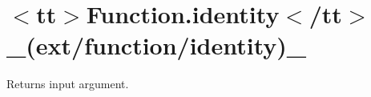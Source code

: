 \chapter{\texorpdfstring{$<$}{<}tt\texorpdfstring{$>$}{>}Function.\+identity\texorpdfstring{$<$}{<}/tt\texorpdfstring{$>$}{>} \+\_\+(ext/function/identity)\+\_\+}
\hypertarget{md__2home_2solype_2delivery_2current__days_2Mannheim_2front_2node__modules_2ext_2docs_2function_2identity}{}\label{md__2home_2solype_2delivery_2current__days_2Mannheim_2front_2node__modules_2ext_2docs_2function_2identity}
\label{md__2home_2solype_2delivery_2current__days_2Mannheim_2front_2node__modules_2ext_2docs_2function_2identity_autotoc_md2568}%
%
 Returns input argument.


\begin{DoxyCode}{0}
\DoxyCodeLine{}

\end{DoxyCode}
 